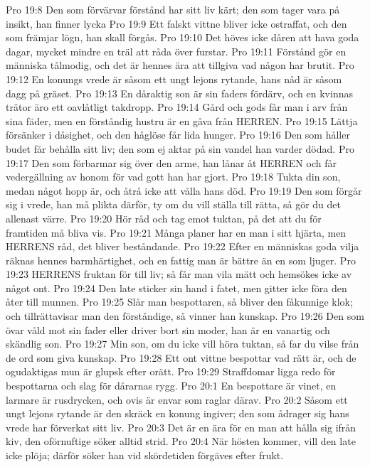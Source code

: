 Pro 19:8  Den som förvärvar förstånd har sitt liv kärt; den som tager vara på insikt, han finner lycka
Pro 19:9  Ett falskt vittne bliver icke ostraffat, och den som främjar lögn, han skall förgås.
Pro 19:10  Det höves icke dåren att hava goda dagar, mycket mindre en träl att råda över furstar.
Pro 19:11  Förstånd gör en människa tålmodig, och det är hennes ära att tillgiva vad någon har brutit.
Pro 19:12  En konungs vrede är såsom ett ungt lejons rytande, hans nåd är såsom dagg på gräset.
Pro 19:13  En dåraktig son är sin faders fördärv, och en kvinnas trätor äro ett oavlåtligt takdropp.
Pro 19:14  Gård och gods får man i arv från sina fäder, men en förståndig hustru är en gåva från HERREN.
Pro 19:15  Lättja försänker i dåsighet, och den håglöse får lida hunger.
Pro 19:16  Den som håller budet får behålla sitt liv; den som ej aktar på sin vandel han varder dödad.
Pro 19:17  Den som förbarmar sig över den arme, han lånar åt HERREN och får vedergällning av honom för vad gott han har gjort.
Pro 19:18  Tukta din son, medan något hopp är, och åtrå icke att vålla hans död.
Pro 19:19  Den som förgår sig i vrede, han må plikta därför, ty om du vill ställa till rätta, så gör du det allenast värre.
Pro 19:20  Hör råd och tag emot tuktan, på det att du för framtiden må bliva vis.
Pro 19:21  Många planer har en man i sitt hjärta, men HERRENS råd, det bliver beståndande.
Pro 19:22  Efter en människas goda vilja räknas hennes barmhärtighet, och en fattig man är bättre än en som ljuger.
Pro 19:23  HERRENS fruktan för till liv; så får man vila mätt och hemsökes icke av något ont.
Pro 19:24  Den late sticker sin hand i fatet, men gitter icke föra den åter till munnen.
Pro 19:25  Slår man bespottaren, så bliver den fåkunnige klok; och tillrättavisar man den förståndige, så vinner han kunskap.
Pro 19:26  Den som övar våld mot sin fader eller driver bort sin moder, han är en vanartig och skändlig son.
Pro 19:27  Min son, om du icke vill höra tuktan, så far du vilse från de ord som giva kunskap.
Pro 19:28  Ett ont vittne bespottar vad rätt är, och de ogudaktigas mun är glupsk efter orätt.
Pro 19:29  Straffdomar ligga redo för bespottarna och slag för dårarnas rygg.
Pro 20:1  En bespottare är vinet, en larmare är rusdrycken, och ovis är envar som raglar därav.
Pro 20:2  Såsom ett ungt lejons rytande är den skräck en konung ingiver; den som ådrager sig hans vrede har förverkat sitt liv.
Pro 20:3  Det är en ära för en man att hålla sig ifrån kiv, den oförnuftige söker alltid strid.
Pro 20:4  När hösten kommer, vill den late icke plöja; därför söker han vid skördetiden förgäves efter frukt.
